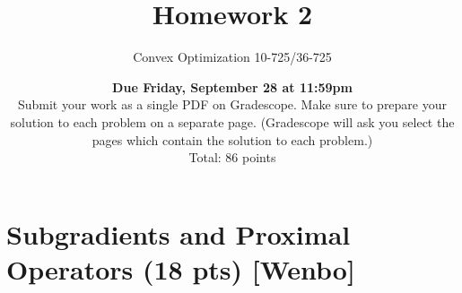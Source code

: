 \documentclass{article}
\theoremstyle{remark}
\theoremstyle{definition}
\begin{document}
\title{Homework 2}
\author{\Large Convex Optimization 10-725/36-725}
\date{{\bf Due Friday, September 28 at 11:59pm} \\
Submit your work as a single PDF on Gradescope. Make sure to prepare your
solution to each problem on a separate page. (Gradescope will ask you select the
pages which contain the solution to each problem.) \\
\bigskip Total: 86 points}
\maketitle


\section{Subgradients and Proximal Operators (18 pts) [Wenbo]}
\end{document}
